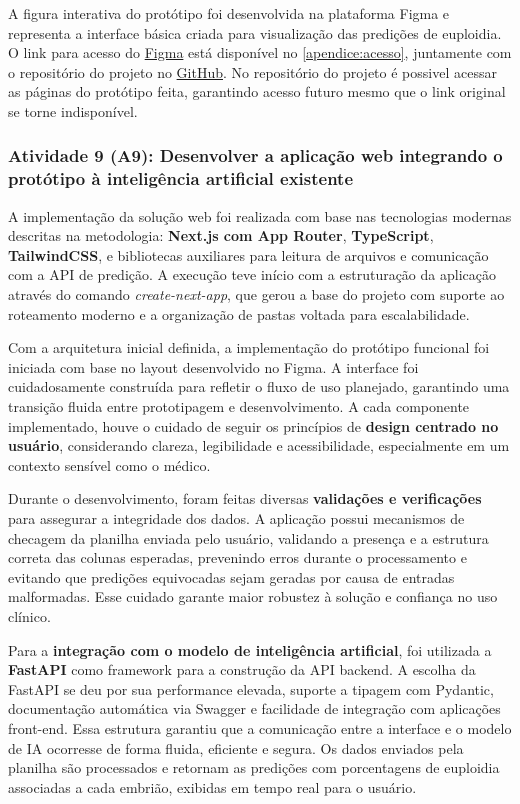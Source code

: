 A figura interativa do protótipo foi desenvolvida na plataforma Figma e representa a interface básica criada para visualização das predições de euploidia. O link para acesso do \href{https://www.figma.com/design/0AstYynXwZO9zVudP1NimJ/Predi%C3%A7%C3%A3o-de-Ploidia}{Figma} está disponível no \autoref{apendice:acesso}, juntamente com o repositório do projeto no \href{https://github.com/CedisUnB/embryo-predictor}{GitHub}. No repositório do projeto é possivel acessar as páginas do protótipo feita, garantindo acesso futuro mesmo que o link original se torne indisponível.

\subsubsection{Atividade 9 (A9):  Desenvolver a aplicação web integrando o protótipo à inteligência artificial existente}
A implementação da solução web foi realizada com base nas tecnologias modernas descritas na metodologia: \textbf{Next.js com App Router}, \textbf{TypeScript}, \textbf{TailwindCSS}, e bibliotecas auxiliares para leitura de arquivos e comunicação com a API de predição. A execução teve início com a estruturação da aplicação através do comando \textit{create-next-app}, que gerou a base do projeto com suporte ao roteamento moderno e a organização de pastas voltada para escalabilidade.

Com a arquitetura inicial definida, a implementação do protótipo funcional foi iniciada com base no layout desenvolvido no Figma. A interface foi cuidadosamente construída para refletir o fluxo de uso planejado, garantindo uma transição fluida entre prototipagem e desenvolvimento. A cada componente implementado, houve o cuidado de seguir os princípios de \textbf{design centrado no usuário}, considerando clareza, legibilidade e acessibilidade, especialmente em um contexto sensível como o médico.

Durante o desenvolvimento, foram feitas diversas \textbf{validações e verificações} para assegurar a integridade dos dados. A aplicação possui mecanismos de checagem da planilha enviada pelo usuário, validando a presença e a estrutura correta das colunas esperadas, prevenindo erros durante o processamento e evitando que predições equivocadas sejam geradas por causa de entradas malformadas. Esse cuidado garante maior robustez à solução e confiança no uso clínico.

Para a \textbf{integração com o modelo de inteligência artificial}, foi utilizada a \textbf{FastAPI} como framework para a construção da API backend. A escolha da FastAPI se deu por sua performance elevada, suporte a tipagem com Pydantic, documentação automática via Swagger e facilidade de integração com aplicações front-end. Essa estrutura garantiu que a comunicação entre a interface e o modelo de IA ocorresse de forma fluida, eficiente e segura. Os dados enviados pela planilha são processados e retornam as predições com porcentagens de euploidia associadas a cada embrião, exibidas em tempo real para o usuário.

